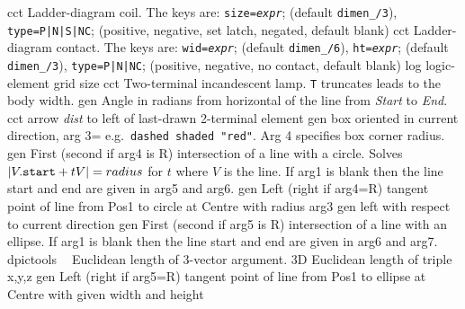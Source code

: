 %

%
  {cct}%
  {Ladder-diagram coil. The keys are:
   {\tt size={\sl expr}}; (default {\tt dimen\_/3}),
   {\tt type=P|N|S|NC}; (positive, negative, set latch, negated, default blank)
   }%
%
  {cct}%
  {Ladder-diagram contact. The keys are:
   {\tt wid={\sl expr}}; (default {\tt dimen\_/6}),
   {\tt ht={\sl expr}}; (default {\tt dimen\_/3}),
   {\tt type=P|N|NC}; (positive, negative, no contact, default blank)
   }%
%
  {log}%
  {logic-element grid size}%
%
  {cct}%
  {Two-terminal incandescent lamp. {\tt T} truncates leads to the body width.
   }%
%
  {gen}%
  {Angle in radians from horizontal of the line from {\sl Start}
  to {\sl End}.}%
%
  {cct}%
  {arrow {\sl dist} to left of last-drawn 2-terminal element
   }%
%
  {gen}%
  {box oriented in current direction, arg 3= e.g.\ {\tt dashed shaded "red"}.
   Arg 4 specifies box corner radius.}%
%
  {gen}%
  { First (second if arg4 is R) intersection of a line with a circle.
    Solves $|V.{\tt start} + tV| = {\sl radius}$ for $t$ where $V$ is the line.
    If arg1 is blank then the line start and end are given in arg5 and arg6.}%
%
  {gen}%
  { Left (right if arg4=R) tangent point of line
     from Pos1 to circle at Centre with radius arg3}%
%
  {gen}%
  {left with respect to current direction }%
%
  {gen}%
  { First (second if arg5 is R) intersection of a line with an ellipse.
    If arg1 is blank then the line start and end are given in arg6 and arg7.}%
%
  {dpictools}%
  {$\;\;$ Euclidean length of 3-vector argument.}%
%
  {3D}%
  {Euclidean length of triple x,y,z}%
%
  {gen}%
  { Left (right if arg5=R) tangent point of line
     from Pos1 to ellipse at Centre with given width and height}%
